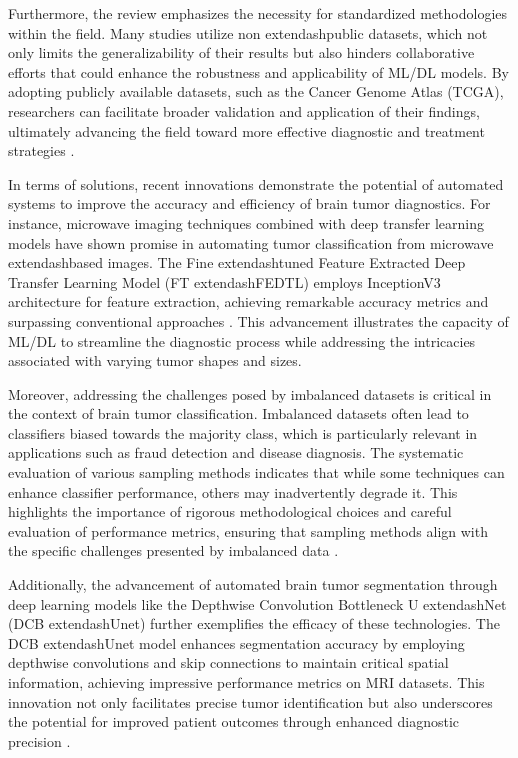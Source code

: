 \documentclass[runningheads]{llncs}
\begin{document}
Furthermore, the review emphasizes the necessity for standardized methodologies within the field. Many studies utilize non	extendash{}public datasets, which not only limits the generalizability of their results but also hinders collaborative efforts that could enhance the robustness and applicability of ML/DL models. By adopting publicly available datasets, such as the Cancer Genome Atlas (TCGA), researchers can facilitate broader validation and application of their findings, ultimately advancing the field toward more effective diagnostic and treatment strategies \cite{Chun_2025}.

In terms of solutions, recent innovations demonstrate the potential of automated systems to improve the accuracy and efficiency of brain tumor diagnostics. For instance, microwave imaging techniques combined with deep transfer learning models have shown promise in automating tumor classification from microwave	extendash{}based images. The Fine	extendash{}tuned Feature Extracted Deep Transfer Learning Model (FT	extendash{}FEDTL) employs InceptionV3 architecture for feature extraction, achieving remarkable accuracy metrics and surpassing conventional approaches \cite{Amran_2024}. This advancement illustrates the capacity of ML/DL to streamline the diagnostic process while addressing the intricacies associated with varying tumor shapes and sizes.

Moreover, addressing the challenges posed by imbalanced datasets is critical in the context of brain tumor classification. Imbalanced datasets often lead to classifiers biased towards the majority class, which is particularly relevant in applications such as fraud detection and disease diagnosis. The systematic evaluation of various sampling methods indicates that while some techniques can enhance classifier performance, others may inadvertently degrade it. This highlights the importance of rigorous methodological choices and careful evaluation of performance metrics, ensuring that sampling methods align with the specific challenges presented by imbalanced data \cite{Misuk_2022}.

Additionally, the advancement of automated brain tumor segmentation through deep learning models like the Depthwise Convolution Bottleneck U	extendash{}Net (DCB	extendash{}Unet) further exemplifies the efficacy of these technologies. The DCB	extendash{}Unet model enhances segmentation accuracy by employing depthwise convolutions and skip connections to maintain critical spatial information, achieving impressive performance metrics on MRI datasets. This innovation not only facilitates precise tumor identification but also underscores the potential for improved patient outcomes through enhanced diagnostic precision \cite{Akter_2024}.
\end{document}
